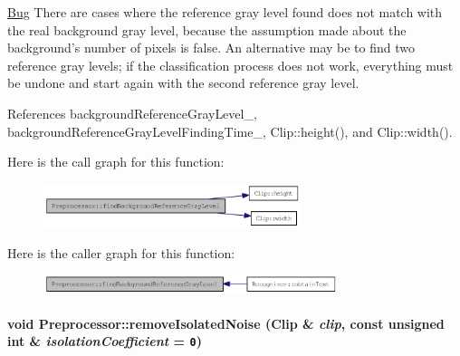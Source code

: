 \begin{Desc}
\item[\hyperlink{bug__bug000001}{Bug}]There are cases where the reference gray level found does not match with the real background gray level, because the assumption made about the background's number of pixels is false. An alternative may be to find two reference gray levels; if the classification process does not work, everything must be undone and start again with the second reference gray level. \end{Desc}


References backgroundReferenceGrayLevel\_\-, backgroundReferenceGrayLevelFindingTime\_\-, Clip::height(), and Clip::width().

Here is the call graph for this function:\nopagebreak
\begin{figure}[H]
\begin{center}
\leavevmode
\includegraphics[width=213pt]{class_preprocessor_a941f81382bd8e235e4dd12481342be4_cgraph}
\end{center}
\end{figure}


Here is the caller graph for this function:\nopagebreak
\begin{figure}[H]
\begin{center}
\leavevmode
\includegraphics[width=244pt]{class_preprocessor_a941f81382bd8e235e4dd12481342be4_icgraph}
\end{center}
\end{figure}
\hypertarget{class_preprocessor_a3e047486a0a80f2103f51d7141e41c5}{
\paragraph[removeIsolatedNoise]{\setlength{\rightskip}{0pt plus 5cm}void Preprocessor::removeIsolatedNoise ({\bf Clip} \& {\em clip}, \/  const unsigned int \& {\em isolationCoefficient} = {\tt 0})}\hfill}
\label{class_preprocessor_a3e047486a0a80f2103f51d7141e41c5}


